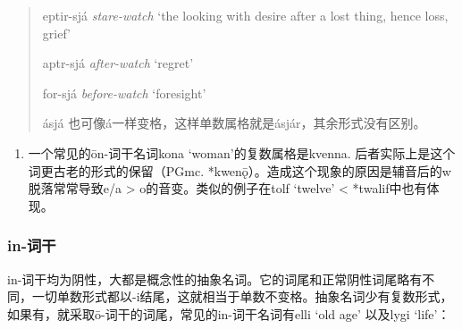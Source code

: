 \begin{quote}
  eptir-sjá \emph{stare-watch} `the looking with desire after a lost
  thing, hence loss, grief'

  aptr-sjá \emph{after-watch} `regret'

  for-sjá \emph{before-watch} `foresight'

  ásjá 也可像á一样变格，这样单数属格就是ásjár，其余形式没有区别。
\end{quote}

\begin{enumerate}
  \def\labelenumi{\arabic{enumi})}
  \setcounter{enumi}{1}
  \item
        一个常见的ōn-词干名词kona `woman'的复数属格是kvenna.
        后者实际上是这个词更古老的形式的保留（PGmc.
        *kwenǭ）。造成这个现象的原因是辅音后的w脱落常常导致e/a \textgreater{}
        o的音变。类似的例子在tolf `twelve' \textless{} *twalif中也有体现。
\end{enumerate}

\subsubsection{in-词干}\label{in-ux8bcdux5e72}

in-词干均为阴性，大都是概念性的抽象名词。它的词尾和正常阴性词尾略有不同，一切单数形式都以-i结尾，这就相当于单数不变格。抽象名词少有复数形式，如果有，就采取ō-词干的词尾，常见的in-词干名词有elli
`old age' 以及lygi `life'：

